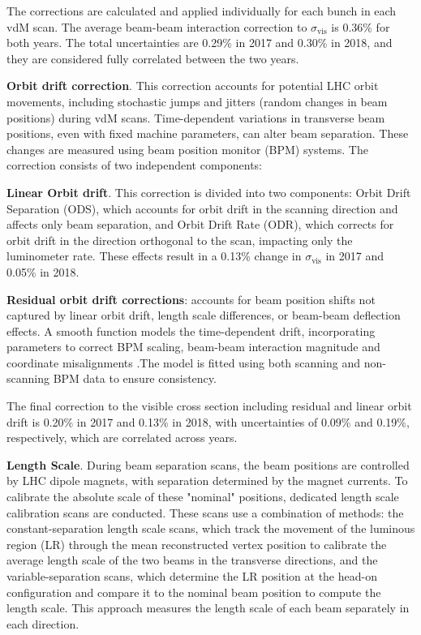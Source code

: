 \begin{enumerate}
{The corrections are calculated and applied individually for each bunch in each vdM scan. The average beam-beam interaction correction to $\sigma_{\mathrm{vis}}$ is 0.36\% for both years. The total uncertainties are 0.29\% in 2017 and 0.30\% in 2018, and they are considered fully correlated between the two years.


\item \textbf{Orbit drift correction}. This correction accounts for potential LHC orbit movements, including stochastic jumps and jitters (random changes in beam positions) during vdM scans. Time-dependent variations in transverse beam positions, even with fixed machine parameters, can alter beam separation. These changes are measured using beam position monitor (BPM) systems. The correction consists of two independent components:

\textbf{Linear Orbit drift}. This correction is divided into two components: Orbit Drift Separation (ODS), which accounts for orbit drift in the scanning direction and affects only beam separation, and Orbit Drift Rate (ODR), which corrects for orbit drift in the direction orthogonal to the scan, impacting only the luminometer rate. These effects result in a 0.13\% change in $\sigma_{\mathrm{vis}}$ in 2017 and 0.05\% in 2018.

\textbf{Residual orbit drift corrections}: accounts for beam position shifts not captured by linear orbit drift, length scale differences, or beam-beam deflection effects. A smooth function models the time-dependent drift, incorporating parameters to correct BPM scaling, beam-beam interaction magnitude and coordinate misalignments .The model is fitted using both scanning and non-scanning BPM data to ensure consistency. 


The final correction to the visible cross section including residual and linear orbit drift is 0.20\% in 2017 and 0.13\% in 2018, with uncertainties of 0.09\% and 0.19\%, respectively, which are correlated across years.


\item \textbf{Length Scale}. During beam separation scans, the beam positions are controlled by LHC dipole magnets, with separation determined by the magnet currents. To calibrate the absolute scale of these "nominal" positions, dedicated length scale calibration scans are conducted. These scans use a combination of methods: the constant-separation length scale scans, which track the movement of the luminous region (LR) through the mean reconstructed vertex position to calibrate the average length scale of the two beams in the transverse directions, and the variable-separation scans, which determine the LR position at the head-on configuration and compare it to the nominal beam position to compute the length scale. This approach measures the length scale of each beam separately in each direction. 

}
\end{enumerate}
